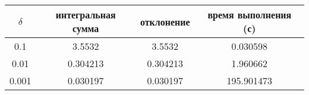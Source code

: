 \begin{tabular}{|c|c|c|c|}
    \hline
    $\delta$ & интегральная сумма & отклонение & время выполнения (с)\\
    \hline
    0.1 & 3.5532 & 3.5532 & 0.030598\\
    \hline
    0.01 & 0.304213 & 0.304213 & 1.960662\\
    \hline
    0.001 & 0.030197 & 0.030197 & 195.901473\\
    \hline
\end{tabular}